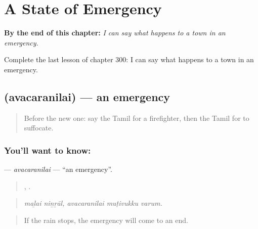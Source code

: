 
\chapter{A State of Emergency}
\label{ch:ta-a-state-of-emergency}

\begin{chapteropening}
\textbf{By the end of this chapter:} \emph{I can say what happens to a town in an emergency.}

Complete the last lesson of chapter 300: I can say what happens to a town in an emergency.
\end{chapteropening}

\section[\texorpdfstring{\ta{அவசரநிலை} (avacaranilai)}{அவசரநிலை (avacaranilai)}]{ (avacaranilai) — an emergency}

\label{lesson:TA-C300-avacaranilai}



\begin{quote}
Before the new one: say the Tamil for a firefighter, then the Tamil for to suffocate.
\end{quote}

\subsection*{You'll want to know: }
\textbf{} — \emph{avacaranilai} — \textquotedblleft{}an emergency\textquotedblright{}.

\begin{quote}
 ,   .
\end{quote}

\begin{quote}
\emph{maḻai niṉṟāl, avacaranilai muṭivukku varum.}
\end{quote}

\begin{quote}
If the rain stops, the emergency will come to an end.
\end{quote}

